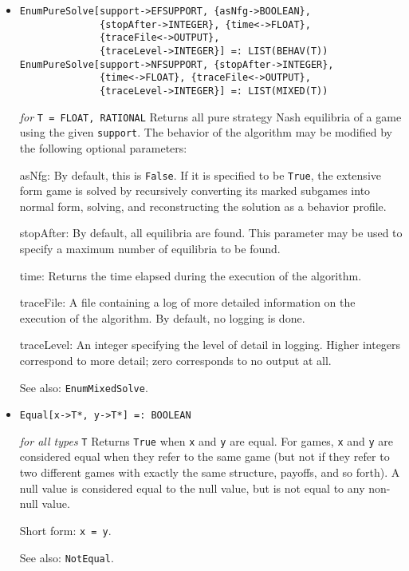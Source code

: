 \begin{itemize}
\item{}
\protect \large \begin{verbatim}
EnumPureSolve[support->EFSUPPORT, {asNfg->BOOLEAN},
              {stopAfter->INTEGER}, {time<->FLOAT},
              {traceFile<->OUTPUT},
              {traceLevel->INTEGER}] =: LIST(BEHAV(T))
EnumPureSolve[support->NFSUPPORT, {stopAfter->INTEGER},
              {time<->FLOAT}, {traceFile<->OUTPUT},
              {traceLevel->INTEGER}] =: LIST(MIXED(T)) 
\end{verbatim}\normalsize

{\it for} {\tt T = FLOAT, RATIONAL}
\bd
Returns all pure strategy Nash equilibria of a game using the given
\verb+support+.  The behavior
of the algorithm may be modified by the following optional parameters:
\bd
\item
[asNfg:] By default, this is \verb+False+.  If it is specified to be
\verb+True+, the extensive form game is solved by recursively converting
its marked subgames into normal form, solving, and reconstructing the
solution as a behavior profile.
\item
[stopAfter:] By default, all equilibria are found.  This parameter may
be used to specify a maximum number of equilibria to be found.
\item
[time:] Returns the time elapsed during the execution
of the algorithm.
\item
[traceFile:] A file containing a log of more detailed information on the
execution of the algorithm.  By default, no logging is done.
\item
[traceLevel:] An integer specifying the level of detail in logging.  Higher
integers correspond to more detail; zero corresponds to no output at all.
\ed
\item
[See also:] \verb+EnumMixedSolve+.
\ed

\item{}
\protect \large \begin{verbatim}
Equal[x->T*, y->T*] =: BOOLEAN
\end{verbatim}\normalsize

{\it for all types} {\tt T}
\bd
Returns \verb+True+ when \verb+x+ and \verb+y+ are equal.  For games,
\verb+x+ and \verb+y+ are considered equal when they refer to the same
game (but not if they refer to two different games with exactly the
same structure, payoffs, and so forth).  A null value is considered equal
to the null value, but is not equal to any non-null value.
\item
[Short form:] \verb+x = y+.
\item
[See also:] \verb+NotEqual+.
\ed


\end{itemize}
